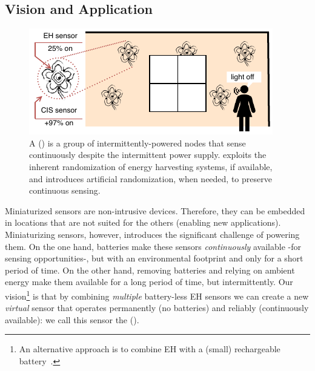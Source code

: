 \subsection{Vision and Application}
%
\begin{figure}[t]
	\centering
	\includegraphics[width=\columnwidth]{figures/smart_fabric}
	\caption{A \fullcis (\cis) is a group of intermittently-powered nodes that sense continuously despite the intermittent power supply. \cis exploits the inherent randomization of energy harvesting systems, if available, and introduces artificial randomization, when needed, to preserve continuous sensing.}
	\label{fig:smart_fabric}
\end{figure}
%
Miniaturized sensors are non-intrusive devices. Therefore,
they can be embedded in locations that are not suited for the others (enabling
new applications). Miniaturizing sensors, however, introduces the significant
challenge of powering them.
%
On the one hand, batteries make these sensors \emph{continuously}
available -for sensing opportunities-, but with an environmental footprint
and only for a short period of time.
%
On the other hand, removing batteries and relying on ambient energy make them
available for a long period of time, but intermittently. 
%
Our vision\footnote{An alternative approach is to combine EH with a
(small) rechargeable battery~\cite{jackson2018reconsidering, jackson_ipsn_2019}.} is that by combining {\em multiple} battery-less EH sensors we can create a new {\em virtual} sensor that operates permanently (no batteries) and reliably (continuously available): we call this sensor the \emph{\fullcis} (\cis).

